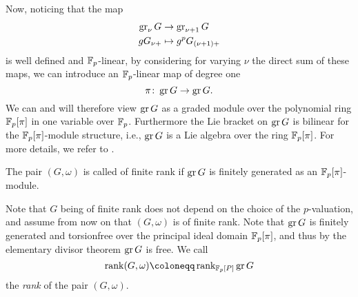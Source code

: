 Now, noticing that the map
\begin{align*}
  \operatorname{gr}_{\nu} G &\to \operatorname{gr}_{\nu+1} G \\
  gG_{\nu+} &\mapsto g^pG_{(\nu+1)+}
\end{align*}
is well defined and $\mathbb{F}_p$-linear, by considering for varying $\nu$ the direct sum of these maps, we can introduce an $\mathbb{F}_p$-linear map of degree one
\begin{equation*}
  \pi \colon \operatorname{gr} G \to \operatorname{gr} G.
\end{equation*}%
%
We can and will therefore view $\operatorname{gr} G$ as a graded module over the polynomial ring $\mathbb{F}_p[\pi]$ in one variable over $\mathbb{F}_p$. Furthermore the Lie bracket on $\operatorname{gr} G$ is bilinear for the $\mathbb{F}_p[\pi]$-module structure, i.e., $\operatorname{gr} G$ is a Lie algebra over the ring $\mathbb{F}_p[\pi]$. For more details, we refer to \cite[Sect.~25]{Sch}.
\begin{definition}
  The pair $(G,\omega)$ is called of finite rank if $\operatorname{gr} G$ is finitely generated as an $\mathbb{F}_p[\pi]$-module.
\end{definition}
Note that $G$ being of finite rank does not depend on the choice of the $p$-valuation, and assume from now on that $(G,\omega)$ is of finite rank. Note that $\operatorname{gr} G$ is finitely generated and torsionfree over the principal ideal domain $\mathbb{F}_{p}[\pi]$, and thus by the elementary divisor theorem  $\operatorname{gr} G$ is free. We call
\begin{equation*}
  \rank(G,\omega) \coloneqq \rank_{\F_p[P]} \gr G
\end{equation*}%
%
the \emph{rank} of the pair $(G,\omega)$.

